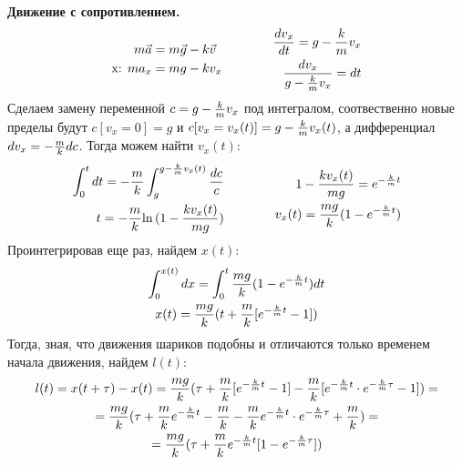 \documentclass[a5paper,10pt]{article}
\begin{document}
\textbf{Движение с сопротивлением.}
\begin{equation*}
    \xdef\km{\frac{k}{m}}\xdef\mk{\frac{m}{k}}\xdef\mgk{\frac{mg}{k}}%
    \begin{aligned}[c]
        m\vec{a}&=m\vec{g}-k\vec{v}\\
        \text{x: } ma_x&=mg-kv_x\\
    \end{aligned}
        \qquad\qquad
    \begin{aligned}[c]
        \frac{dv_x}{dt}=g-\km{}v_x\\
        \frac{dv_x}{g-\km{}v_x}=dt\\
    \end{aligned}
\end{equation*}
Сделаем замену переменной $c=g-\km{}v_x$ под интегралом, соотвественно новые пределы будут $c[v_x=0]=g$ и $c[v_x=v_x(t)]=g-\km{}v_x(t)$, а дифференциал $dv_x=-\mk{}dc$. Тогда можем найти $v_x(t)$:
\begin{equation*}
    \begin{aligned}[c]
        \int_0^{t}dt=-\mk\int_g^{g-\km{}v_x(t)}\frac{dc}{c}\\
        t=-\mk{\ln{(1-\frac{kv_x(t)}{mg})}}\\
    \end{aligned}
        \qquad\qquad
    \begin{aligned}[c]
        1-\frac{kv_x(t)}{mg}=e^{-\km{t}}\\
        v_x(t)=\mgk(1-e^{-\km{t}})\\
    \end{aligned}
\end{equation*}
Проинтегрировав еще раз, найдем $x(t)$:
\begin{gather*}
    \int_0^{x(t)} dx = \int_0^t \mgk(1-e^{-\km{t}}) dt\\
    x(t)=\mgk(t+\mk{}[e^{-\km{t}}-1])\\
\end{gather*}
Тогда, зная, что движения шариков подобны и отличаются только временем начала движения, найдем $l(t)$:
\begin{gather*}
    l(t)=x(t+\tau)-x(t)=\mgk(\tau+\mk{}[e^{-\km{t}}-1]-\mk{}[e^{-\km{t}}\cdot{}e^{-\km{\tau}}-1])=\\=\mgk(\tau+\mk{e^{-\km{t}}}-\mk-\mk{e^{-\km{t}}\cdot{}e^{-\km{\tau}}}+\mk)=\\
    =\mgk(\tau+\mk{e^{-\km{t}}}[1-e^{-\km{\tau}}])    
\end{gather*}
\end{document}
